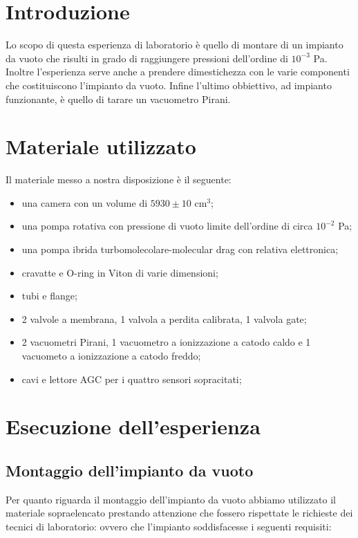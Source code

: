 \section{Introduzione}

Lo scopo di questa esperienza di laboratorio è quello di montare di un impianto da vuoto che risulti in
grado di raggiungere pressioni dell'ordine di $10^{-3}$ \si{\pascal}. Inoltre l'esperienza serve anche a
prendere dimestichezza con le varie componenti che costituiscono l'impianto da vuoto.
Infine l'ultimo obbiettivo, ad impianto funzionante, è quello di tarare un vacuometro Pirani.

\section{Materiale utilizzato}

Il materiale messo a nostra disposizione è il seguente:

\begin{itemize}
	\item{una camera con un volume di $5930 \pm 10$ \si{\centi\metre}$^3$;}
	\item{una pompa rotativa con pressione di vuoto limite dell'ordine di circa $10^{-2}$ \si{\pascal};}
	\item{una pompa ibrida turbomolecolare-molecular drag con relativa elettronica;}
	\item{cravatte e O-ring in Viton di varie dimensioni;}
	\item{tubi e flange;} %
	\item{2 valvole a membrana, 1 valvola a perdita calibrata, 1 valvola gate;}
	\item{2 vacuometri Pirani, 1 vacuometro a ionizzazione a catodo caldo e 1 vacuometo a ionizzazione a catodo freddo;}
	\item{cavi e lettore AGC per i quattro sensori sopracitati;}
\end{itemize}

\section{Esecuzione dell'esperienza}

\subsection{Montaggio dell'impianto da vuoto}

Per quanto riguarda il montaggio dell'impianto da vuoto abbiamo utilizzato il materiale sopraelencato
prestando attenzione che fossero rispettate le richieste dei tecnici di laboratorio:
ovvero che l'impianto soddisfacesse i seguenti requisiti:

